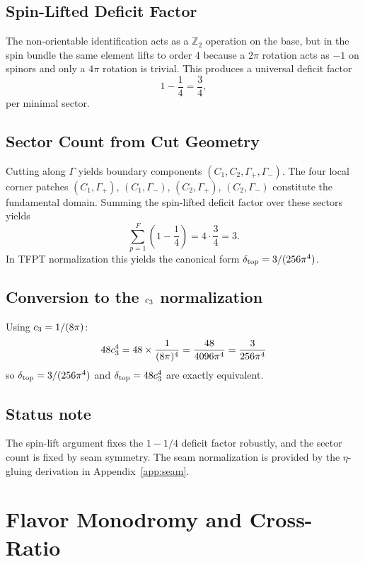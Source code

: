 \subsection{Spin-Lifted Deficit Factor}
The non-orientable identification acts as a $\mathbb{Z}_2$ operation on the base,
but in the spin bundle the same element lifts to order $4$ because a $2\pi$ rotation
acts as $-1$ on spinors and only a $4\pi$ rotation is trivial. This produces a
universal deficit factor
\begin{equation}
    1-\frac{1}{4}=\frac{3}{4},
\end{equation}
per minimal sector.

\subsection{Sector Count from Cut Geometry}
Cutting along $\Gamma$ yields boundary components $(C_1,C_2,\Gamma_+,\Gamma_-)$.
The four local corner patches
$(C_1,\Gamma_+)$, $(C_1,\Gamma_-)$, $(C_2,\Gamma_+)$, $(C_2,\Gamma_-)$
constitute the fundamental domain. Summing the spin-lifted deficit factor over these sectors yields
\begin{equation}
    \sum_{p=1}^{F}\left(1-\frac{1}{4}\right)=4\cdot\frac{3}{4}=3.
\end{equation}
In TFPT normalization this yields the canonical form $\delta_{\mathrm{top}} = 3/(256\pi^4)$.

\subsection{Conversion to the $c_3$ normalization}

Using $c_3 = 1/(8\pi)$:
\begin{equation}
    48c_3^4 = 48 \times \frac{1}{(8\pi)^4} 
    = \frac{48}{4096\pi^4}
    = \frac{3}{256\pi^4}
\end{equation}
so $\delta_{\mathrm{top}} = 3/(256\pi^4)$ and $\delta_{\mathrm{top}} = 48c_3^4$ are exactly equivalent.

\subsection{Status note}
The spin-lift argument fixes the $1-1/4$ deficit factor robustly, and the sector count
is fixed by seam symmetry. The seam normalization is provided by the $\eta$-gluing
derivation in Appendix~\ref{app:seam}.

\section{Flavor Monodromy and Cross-Ratio}
\label{app:flavor}

